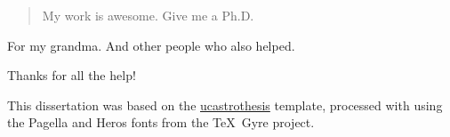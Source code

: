 \documentclass[12pt]{myucthesis}
\begin{document}
\ssp %
\hypersetup{pageanchor=false}

\maketitle
\copyrightpage

\begin{abstract}
My work is awesome. Give me a Ph.D.
\end{abstract}

\hypersetup{pageanchor=true}
\begin{frontmatter}

\begin{dedication}
\null\vfil
{\large
\begin{center}
For my grandma. And other people who also helped.
\end{center}}
\null\vfil
\end{dedication}

\tableofcontents
\listoffigures %
\listoftables %


\begin{acknowledgements}
Thanks for all the help!

This dissertation was based on the
\href{https://github.com/pkgw/ucastrothesis}{\textsf{ucastrothesis}}
template, processed with  using the Pagella and Heros fonts
from the \TeX\ Gyre project.

\end{acknowledgements}
\end{frontmatter}












\printbibliography[heading=bibintoc]

\appendix






\end{document}
